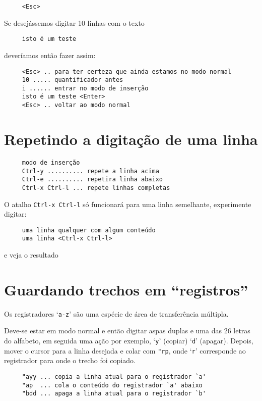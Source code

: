 \begin{verbatim}
     <Esc>
\end{verbatim}

Se desejássemos digitar 10 linhas com o texto

\begin{verbatim}
     isto é um teste
\end{verbatim}

deveríamos então fazer assim:
   
\begin{verbatim}
     <Esc> .. para ter certeza que ainda estamos no modo normal
     10 ..... quantificador antes
     i ...... entrar no modo de inserção
     isto é um teste <Enter>
     <Esc> .. voltar ao modo normal
\end{verbatim}

\section{Repetindo a digitação de uma linha }

\begin{verbatim}
     modo de inserção
     Ctrl-y .......... repete a linha acima 
     Ctrl-e .......... repetira linha abaixo 
     Ctrl-x Ctrl-l ... repete linhas completas
\end{verbatim}


O atalho {\tt Ctrl-x Ctrl-l} só funcionará para uma 
linha semelhante, experimente digitar:

\begin{verbatim}
     uma linha qualquer com algum conteúdo
     uma linha <Ctrl-x Ctrl-l>
\end{verbatim}

e veja o resultado

\section{Guardando trechos em ``registros''}
\label{sec:Guardando trechos em ``registros''}

Os registradores `{\tt a-z}' são uma espécie de área de transferência múltipla.

Deve-se estar em modo normal e então digitar aspas duplas e uma
das 26 letras do alfabeto, em seguida uma ação por exemplo, `{\tt y}'
(copiar) `{\tt d}' (apagar). Depois, mover o cursor para a linha
desejada e colar com \verb+"rp+, onde `{\tt r}' corresponde ao
registrador para onde o trecho foi copiado.

\begin{verbatim}
     "ayy ... copia a linha atual para o registrador `a'
     "ap  ... cola o conteúdo do registrador `a' abaixo
     "bdd ... apaga a linha atual para o registrador `b'
\end{verbatim}

